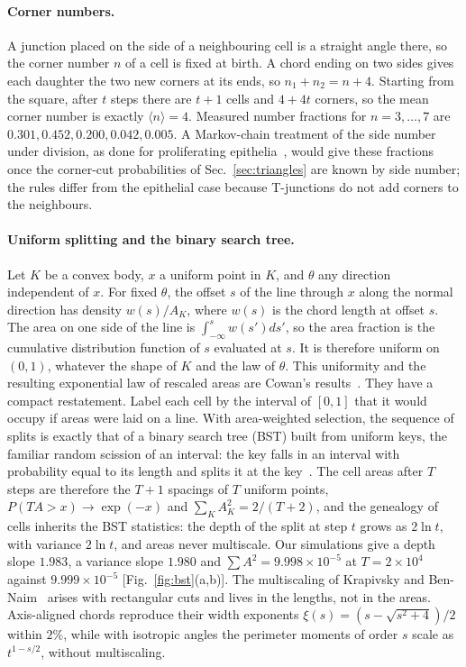 \documentclass[pre,twocolumn,superscriptaddress,amsmath,amssymb,floatfix]{revtex4-2}
\begin{document}
\paragraph*{Corner numbers.}
A junction placed on the side of a neighbouring cell is a straight angle there, so
the corner number $n$ of a cell is fixed at birth. A chord ending on two sides gives
each daughter the two new corners at its ends, so $n_1+n_2=n+4$. Starting from the
square, after $t$ steps there are $t+1$ cells and $4+4t$ corners, so the mean corner
number is exactly $\langle n\rangle=4$. Measured number fractions for $n=3,\dots,7$
are $0.301,0.452,0.200,0.042,0.005$. A Markov-chain treatment of the side number under
division, as done for proliferating epithelia~\cite{gibson2006}, would give these
fractions once the corner-cut probabilities of Sec.~\ref{sec:triangles} are known by
side number; the rules differ from the epithelial case because T-junctions do not add
corners to the neighbours.

\paragraph*{Uniform splitting and the binary search tree.}
Let $K$ be a convex body, $x$ a uniform point in $K$, and $\theta$ any direction
independent of $x$. For fixed $\theta$, the offset $s$ of the line through $x$ along
the normal direction has density $w(s)/A_K$, where $w(s)$ is the chord length at
offset $s$. The area on one side of the line is $\int_{-\infty}^s w(s')ds'$, so the
area fraction is the cumulative distribution function of $s$ evaluated at $s$. It is
therefore uniform on $(0,1)$, whatever the shape of $K$ and the law of $\theta$. This
uniformity and the resulting exponential law of rescaled areas are Cowan's
results~\cite{cowan2010}. They have a compact restatement. Label each cell by the
interval of $[0,1]$ that it would occupy if areas were laid on a line. With
area-weighted selection, the sequence of splits is exactly that of a binary search tree
(BST) built from uniform keys, the familiar random scission of an interval: the key
falls in an interval with probability equal to its length and splits it at the
key~\cite{devroye1986}. The cell areas after $T$ steps are therefore the $T+1$
spacings of $T$ uniform points, $P(TA>x)\to\exp(-x)$ and $\sum_KA_K^2=2/(T+2)$, and
the genealogy of cells inherits the BST statistics: the depth of the split at step $t$
grows as $2\ln t$, with variance $2\ln t$, and areas never multiscale. Our
simulations give a depth slope $1.983$, a variance slope $1.980$ and $\sum A^2=9.998\times10^{-5}$
at $T=2\times10^4$ against $9.999\times10^{-5}$ [Fig.~\ref{fig:bst}(a,b)]. The
multiscaling of Krapivsky and Ben-Naim~\cite{krapivsky1994} arises with rectangular
cuts and lives in the lengths, not in the areas. Axis-aligned chords reproduce their
width exponents $\xi(s)=(s-\sqrt{s^2+4})/2$ within $2\%$, while with isotropic
angles the perimeter moments of order $s$ scale as $t^{1-s/2}$, without multiscaling.
\end{document}
